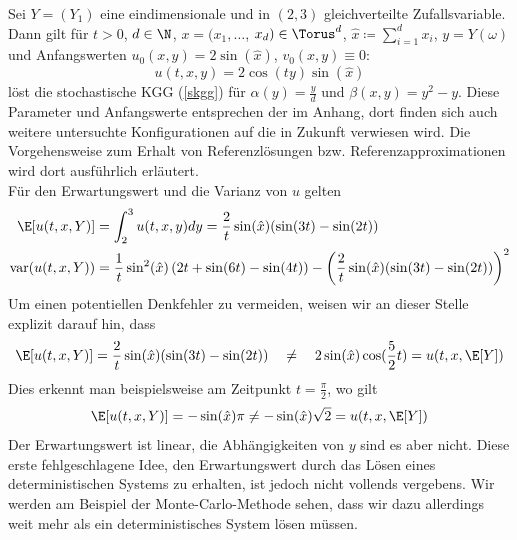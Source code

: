 \begin{mathbsp}
\label{bsp:trial1}
Sei $Y=(Y_1)$ eine eindimensionale und in $(2,3)$ gleichverteilte Zufallsvariable. Dann gilt für $t>0$, $d\in\N$, $x=(x_1,\dots$, $x_d)\in\Torus^d$, $\hat{x}\coloneqq \sum_{i=1}^d x_i$, $y=Y(\omega)$ und Anfangswerten $u_0(x,y)=2\sin(\hat{x})$, $v_0(x,y)\equiv 0:$
\begin{equation*}
u(t,x,y)=2\cos(ty)\sin(\hat{x})
\end{equation*}
löst die stochastische KGG (\ref{skgg}) für $\alpha(y)=\frac{y}{d}$ und $\beta(x,y)=y^2-y$. Diese Parameter und Anfangswerte entsprechen der  im Anhang, dort finden sich auch weitere untersuchte Konfigurationen auf die in Zukunft verwiesen wird. Die Vorgehensweise zum Erhalt von Referenzlösungen bzw. Referenzapproximationen wird dort ausführlich erläutert.\\
Für den Erwartungswert und die Varianz von $u$ gelten
\begin{align*}
\E[u(t,x,Y)]&=\int_2^3u(t,x,y)dy=\frac{2}{t}\sin(\hat{x})(\sin(3t) - \sin(2t))\\
\text{var}(u(t,x,Y))&=\frac{1}{t}\sin^2(\hat{x})\left(2t + \sin(6t) - \sin(4t)\right)- \left(\frac{2}{t}\sin(\hat{x})(\sin(3t) - \sin(2t))\right)^2
\end{align*}
Um einen potentiellen Denkfehler zu vermeiden, weisen wir an dieser Stelle explizit darauf hin, dass 
\[\E[u(t,x,Y)]=\frac{2}{t}\sin(\hat{x})(\sin(3t) - \sin(2t))\quad \neq \quad 2\sin(\hat{x})\cos(\frac{5}{2}t)=u(t,x,\E[Y])\]
Dies erkennt man beispielsweise am Zeitpunkt $t=\frac{\pi}{2}$, wo gilt
\[\E[u(t,x,Y)]=-\sin(\hat{x})\pi \neq -\sin(\hat{x})\sqrt{2}=u(t,x,\E[Y])\]
Der Erwartungswert ist linear, die Abhängigkeiten von $y$ sind es aber nicht. Diese erste fehlgeschlagene Idee, den Erwartungswert durch das Lösen eines deterministischen Systems zu erhalten, ist jedoch nicht vollends vergebens. Wir werden am Beispiel der Monte-Carlo-Methode sehen, dass wir dazu allerdings weit mehr als ein deterministisches System lösen müssen.
\end{mathbsp}

